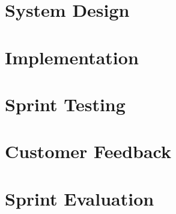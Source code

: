 \section{System Design}


\section{Implementation}


\section{Sprint Testing}


\section{Customer Feedback}


\section{Sprint Evaluation}



